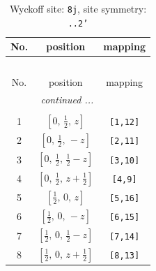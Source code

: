\documentclass[fleqn,8pt]{jsarticle}
\begin{document}
\begin{longtable}{ccc}
\caption{Wyckoff site: {\tt 8j}, site symmetry: {\tt ..2'}}
 \\
 \hline \hline
No. & position & mapping \\ \hline \endfirsthead

\multicolumn{2}{l}{\tablename\ \thetable{}} \\
 \hline \hline
No. & position & mapping \\ \hline \endhead

 \hline \hline
\multicolumn{2}{r}{\footnotesize\it continued ...} \\ \endfoot

 \hline \hline
\multicolumn{2}{r}{} \\ \endlastfoot

1 & $\left[ 0,\, \frac{1}{2},\, z \right]$ & {\tt [1,12]} \\ \hline
2 & $\left[ 0,\, \frac{1}{2},\, - z \right]$ & {\tt [2,11]} \\ \hline
3 & $\left[ 0,\, \frac{1}{2},\, \frac{1}{2} - z \right]$ & {\tt [3,10]} \\ \hline
4 & $\left[ 0,\, \frac{1}{2},\, z + \frac{1}{2} \right]$ & {\tt [4,9]} \\ \hline
5 & $\left[ \frac{1}{2},\, 0,\, z \right]$ & {\tt [5,16]} \\ \hline
6 & $\left[ \frac{1}{2},\, 0,\, - z \right]$ & {\tt [6,15]} \\ \hline
7 & $\left[ \frac{1}{2},\, 0,\, \frac{1}{2} - z \right]$ & {\tt [7,14]} \\ \hline
8 & $\left[ \frac{1}{2},\, 0,\, z + \frac{1}{2} \right]$ & {\tt [8,13]} \\
\end{longtable}
\renewcommand{\arraystretch}{1.2}
\end{document}

